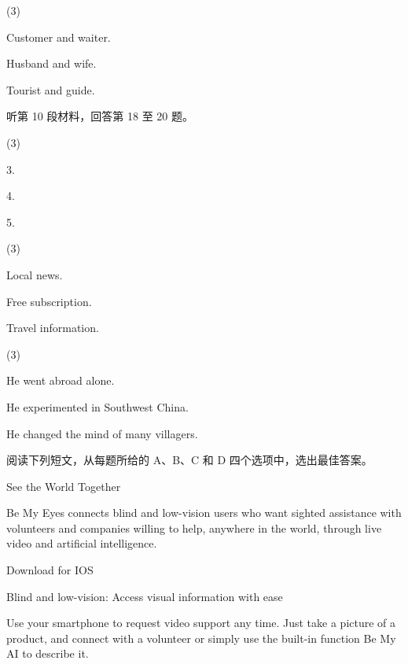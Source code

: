 \documentclass{英语试卷}
\begin{document}
\begin{choices}(3)
  \item Customer and waiter.
  \item Husband and wife.
  \item Tourist and guide.
\end{choices}
\par 听第 10 段材料，回答第 18 至 20 题。\par
{}
\begin{choices}(3)
  \item 3.
  \item 4.
  \item 5.
\end{choices}
\begin{choices}(3)
  \item Local news.
  \item Free subscription.
  \item Travel information.
\end{choices}
\begin{choices}(3)
  \item He went abroad alone.
  \item He experimented in Southwest China.
  \item He changed the mind of many villagers.
\end{choices}
\par 阅读下列短文，从每题所给的 A、B、C 和 D 四个选项中，选出最佳答案。\par
{}
\par See the World Together\par
\par Be My Eyes connects blind and low-vision users who want sighted assistance with volunteers and companies willing to help, anywhere in the world, through live video and artificial intelligence.\par
\par Download for IOS\par
\par Blind and low-vision: Access visual information with ease\par
\par Use your smartphone to request video support any time. Just take a picture of a product, and connect with a volunteer or simply use the built-in function Be My AI to describe it.\par
\end{document}
